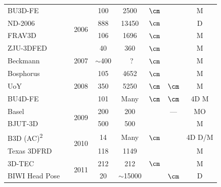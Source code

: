 \begin{table}
{\begin{tabular}{@{}lrcccccc@{}}
BU3D-FE                     &\cite{Yin:2006cc}              & \multirow{4}{*}{2006} & 100         & 2500        & $\cm$       &       & M      \\
ND-2006                     &\cite{faltemier2007using}      &                       & 888         & 13450       & $\cm$       &       & D      \\
FRAV3D                      &\cite{conde2006multimodal}     &                       & 106         & 1696        & $\cm$       &       & M      \\
ZJU-3DFED                   &\cite{wang2006exploring}       &                       & 40          & 360         & $\cm$       &       & M      \\ \midrule
Beckmann                    &\cite{hu2007building}          & 2007                  & $\sim$400   &~?           & $\cm$       &       & M      \\ \midrule
Bosphorus                   &\cite{Savran:2008gg}           & \multirow{3}{*}{2008} & 105         & 4652        & $\cm$       &       & M      \\
UoY                         &\cite{heseltine2008three}      &                       & 350         & 5250        & $\cm$       & $\cm$ & M      \\
BU4D-FE                     &\cite{yin2008high}             &                       & 101         & Many        & $\cm$       & $\cm$ & 4D M   \\ \midrule
Basel                       &\cite{paysan20093d}            & \multirow{2}{*}{2009} & 200         & 200         &             & ---   & MO     \\
BJUT-3D                     &\cite{baocai2009bjut}          &                       & 500         & 500         &             &       & M      \\ \midrule
B3D (AC)\textsuperscript{2} &\cite{fanelli20103}            & \multirow{2}{*}{2010} & 14          & Many        & $\cm$       &       & 4D D/M \\
Texas 3DFRD                 &\cite{gupta2010anthropometric} &                       & 118         & 1149        &             &       & M      \\ \midrule
3D-TEC                      &\cite{vijayan2011twins}        & \multirow{4}{*}{2011} & 212         & 212         & $\cm$       &       & M      \\
BIWI Head Pose              &\cite{fanelli2013random}       &                       & 20          & $\sim$15000 &             & $\cm$ & D      \\

\end{tabular}}
\end{table}
